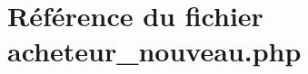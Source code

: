 \hypertarget{acheteur__nouveau_8php}{
\section{R\'{e}f\'{e}rence du fichier acheteur\_\-nouveau.php}
\label{acheteur__nouveau_8php}
}
